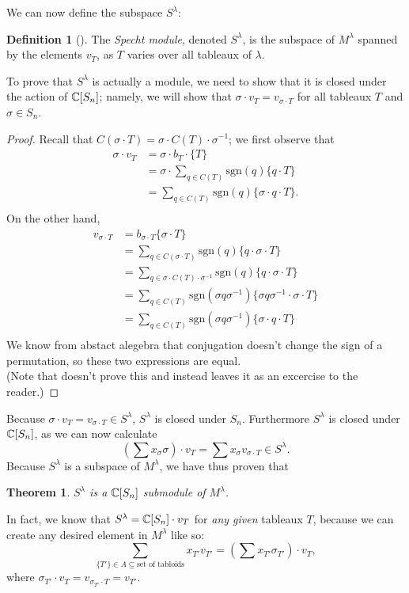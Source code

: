 \documentclass[12pt,twoside]{reedthesis}
\theoremstyle{plain}   %
\newtheorem{thm}{Theorem}[section] %
\theoremstyle{definition}
\newtheorem{defn}{Definition}[section]
\theoremstyle{remark}
\numberwithin{equation}{section}
\def\sgn{\mathrm{sgn}}
\begin{document}
   We can now define the subspace $S^\lambda$:
   \begin{defn}[{\cite[Pg. 87]{fulton}}]
     The \emph{Specht module}, denoted \emph{$S^\lambda$}, is the subspace of $M^\lambda$ spanned by the elements $v_T$, as $T$ varies over all tableaux of
     $\lambda$.
   \end{defn}
   To prove that $S^\lambda$ is actually a module, we need to show that it is closed under the action of $\mathbb{C}[S_n]$; namely,
   we will show that $\sigma \cdot v_T = v_{\sigma \cdot T}$ for all tableaux $T$ and $\sigma \in S_n$.
   \begin{proof}
     Recall that $C(\sigma \cdot T) = \sigma \cdot C(T) \cdot \sigma^{-1}$; we first observe that
     \begin{align*}
       \sigma \cdot v_{T} &= \sigma \cdot b_T \cdot \{ T\} \\
                          &= \sigma \cdot \sum_{ q \in C(T)} \sgn(q) \{q \cdot T\} \\
                          &= \sum_{ q \in C(T)} \sgn(q) \{\sigma \cdot q \cdot T\}. \\
     \end{align*}
     On the other hand,
     \begin{align*}
       v_{\sigma \cdot T} &= b_{\sigma \cdot T} \{ \sigma \cdot T\} \\
                          &= \sum_{q \in C(\sigma \cdot T)} \sgn(q) \{q \cdot \sigma \cdot T\}\\
                          &= \sum_{q \in \sigma \cdot C(T) \cdot \sigma^{-1}} \sgn(q) \{q \cdot \sigma \cdot T\}\\
                          &= \sum_{q \in C(T)} \sgn(\sigma q \sigma^{-1}) \{\sigma q \sigma^{-1} \cdot \sigma \cdot T\}\\
                          &= \sum_{q \in C(T)} \sgn(\sigma q \sigma^{-1}) \{\sigma \cdot q \cdot T\}\\      
     \end{align*}
     We know from abstact alegebra that conjugation doesn't change the sign of a permutation, so these two expressions are equal.\\
     (Note that \cite{fulton} doesn't prove this and instead leaves it as an excercise to the reader.)
   \end{proof}

   Because $\sigma \cdot v_T = v_{\sigma \cdot T} \in S^\lambda$, $S^\lambda$ is closed under $S_n$. Furthermore $S^\lambda$ is closed under $\mathbb{C} [S_n]$, as we can
   now calculate
   \[(\sum x_\sigma \sigma) \cdot v_T = \sum x_\sigma v_{\sigma \cdot T} \in S^\lambda.\]
   Because $S^\lambda$ is a subspace of $M^\lambda$, we have thus proven that
   \begin{thm}
     $S^\lambda$ is a $\mathbb{C}[S_n]$ submodule of $M^\lambda$.
   \end{thm}
   In fact, we know that $S^\lambda = \mathbb{C}[S_n] \cdot v_T$ for \emph{any given} tableaux $T$,
   because we can create any desired element in $M^\lambda$ like so:
   \[\sum_{\{T'\} \in A \subseteq \text{set of tabloids}} x_{T'} v_{T'} = (\sum x_{T'} \sigma_{T'}) \cdot v_T,\]
   where $\sigma_{T'} \cdot v_T = v_{\sigma_{T'} \cdot T} = v_{T'}$.
\end{document}
